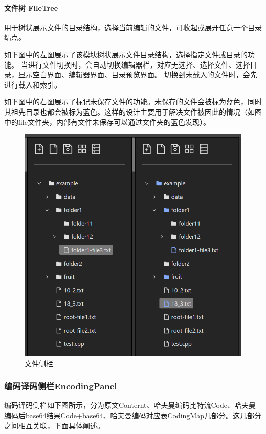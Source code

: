 \documentclass[scheme = chinese]{ctexart}
\begin{document}
\paragraph{文件树 FileTree} 用于树状展示文件的目录结构，选择当前编辑的文件，可收起或展开任意一个目录结点。

如下图中的左图展示了该模块树状展示文件目录结构，选择指定文件或目录的功能。
当进行文件切换时，会自动切换编辑器栏，对应无选择、选择文件、选择目录，显示空白界面、编辑器界面、目录预览界面。
切换到未载入的文件时，会先进行载入和索引。

如下图中的右图展示了标记未保存文件的功能。未保存的文件会被标为蓝色，同时其祖先目录也都会被标为蓝色。这样的设计主要用于解决文件被因此的情况（如图中的file文件夹，内部有文件未保存可以通过文件夹的蓝色发现）。

\begin{figure}[h]
    \centering
    \includegraphics[width=\textwidth]{images/File.png}
    \caption{文件侧栏}
\end{figure}

\clearpage

\subsubsection{编码译码侧栏EncodingPanel}
编码译码侧栏如下图所示，分为原文Conternt、哈夫曼编码比特流Code、哈夫曼编码后base64结果Code+base64、哈夫曼编码对应表CodingMap几部分。这几部分之间相互关联，下面具体阐述。
\end{document}
